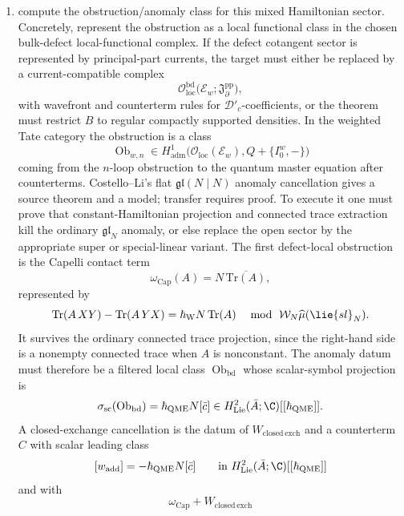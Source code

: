 \documentclass[11pt]{memoir}
\begin{document}
\begin{prob}
\begin{enumerate}
	    \item compute the obstruction/anomaly class for this mixed Hamiltonian
	      sector. Concretely, represent the obstruction as a local
	      functional class in the chosen bulk-defect local-functional complex. If
	      the defect cotangent sector is represented by principal-part currents,
	      the target must either be replaced by a current-compatible complex
	      \[
	        \mathcal O_{\mathrm{loc}}^{\mathrm{bd}}\bigl(
	          \mathcal E_w;\mathfrak J_{\partial}^{\mathrm{pp}}\bigr),
	      \]
	      with wavefront and counterterm rules for \(\mathcal D'_c\)-coefficients,
	      or the theorem must restrict \(B\) to regular compactly supported
	      densities.  In
	      the weighted Tate category the obstruction is a class
	      \[
	        \operatorname{Ob}_{w,n}\in
	        H^1_{\mathrm{adm}}\bigl(\mathcal O_{\mathrm{loc}}(\mathcal E_w),
	          Q+\{I_0^w,-\}\bigr)
	      \]
		      coming from the $n$-loop obstruction to the quantum master equation after
	      counterterms. Costello--Li's flat $\mathfrak{gl}(N\mid N)$ anomaly
      cancellation gives a source theorem and a model; transfer requires
      proof. To execute it one must prove that constant-Hamiltonian
      projection and connected trace extraction kill the ordinary
      $\mathfrak{gl}_N$ anomaly, or else replace the open sector by the
      appropriate super or special-linear variant. The
      first defect-local obstruction is the
      Capelli contact term
      $$\omega_{\mathrm{Cap}}(A)=N\,\overline{\mathrm{Tr}(A)},$$
      represented by
      $$\mathrm{Tr}(A\,XY)-\mathrm{Tr}(A\,YX)
        =\hbar_{\mathrm{W}}N\,\mathrm{Tr}(A)
        \quad\bmod\ \mathcal W_N\widehat\mu(\lie{sl}_N).$$
		      It survives the ordinary connected trace projection, since the
	      right-hand side is a nonempty connected trace when $A$ is nonconstant.
	      The anomaly datum must therefore be a filtered local class
	      \(\operatorname{Ob}_{\mathrm{bd}}\) whose scalar-symbol projection is
	      \[
	        \sigma_{\mathrm{sc}}(\operatorname{Ob}_{\mathrm{bd}})
	          =\hbar_{\mathrm{QME}}N[\bar c]\in
	            H^2_{\mathrm{Lie}}(\bar A;\C)[[\hbar_{\mathrm{QME}}]] .
	      \]
		      A closed-exchange cancellation is the datum of
	      \(W_{\mathrm{closed\,exch}}\) and a counterterm \(C\) with scalar
	      leading class
	      \[
	        [w_{\mathrm{add}}]=-\hbar_{\mathrm{QME}}N[\bar c]
	        \qquad\text{in }
          H^2_{\mathrm{Lie}}(\bar A;\C)[[\hbar_{\mathrm{QME}}]]
	      \]
	      and with
	      $$\omega_{\mathrm{Cap}}+W_{\mathrm{closed\,exch}}
$$
\end{enumerate}
\end{prob}
\end{document}
